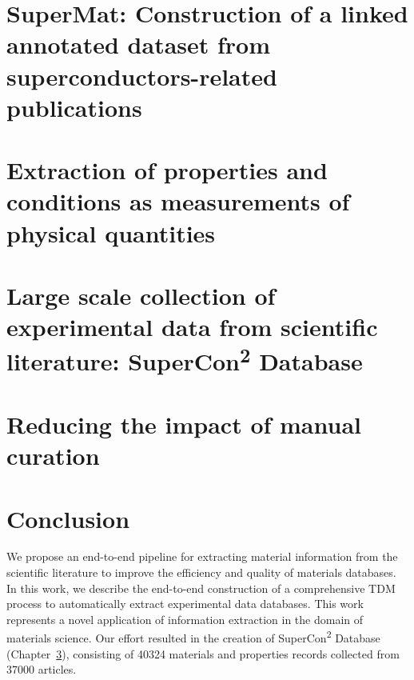 \documentclass[a4paper,11pt]{report}
\begin{document}
\chapter{SuperMat: Construction of a linked annotated dataset from superconductors-related publications}
\label{cha:supermat}


\chapter{Extraction of properties and conditions as measurements of physical quantities}
\label{cha:measurements}


\chapter{Large scale collection of experimental data from scientific literature: SuperCon\texorpdfstring{\textsuperscript{2}}{2} Database}
\label{cha:supercon2}


\chapter{Reducing the impact of manual curation}
\label{cha:curation}


\chapter{Conclusion}
We propose an end-to-end pipeline for extracting material information from the scientific literature to improve the efficiency and quality of materials databases.
In this work, we describe the end-to-end construction of a comprehensive TDM process to automatically extract experimental data databases. 
This work represents a novel application of information extraction in the domain of materials science. 
Our effort resulted in the creation of SuperCon\textsuperscript{2} Database (Chapter~\ref{cha:supercon2}), consisting of 40324 materials and properties records collected from 37000 articles.
\end{document}
